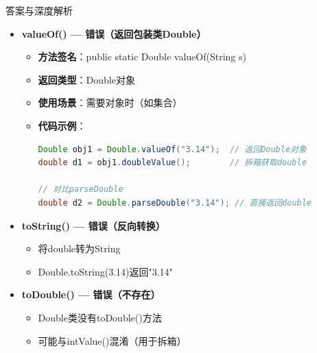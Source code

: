 \documentclass[12pt, a4paper]{ctexart}
\begin{document}
\begin{enumerate}[label=\textbf{\arabic*.}]
\begin{bluebox}{答案与深度解析}
\begin{itemize}[leftmargin=*, nosep, label={}]
\begin{itemize}[label={}, leftmargin=*, nosep]
\begin{lstlisting}[language=Java]
// 异常情况
double d3 = Double.parseDouble("abc");
// NumberFormatException

// 特值解析
double d4 = Double.parseDouble("Infinity");  // 无穷大
double d5 = Double.parseDouble("NaN");       // 非数字
double d6 = Double.parseDouble("-Infinity"); // 负无穷
				            \end{lstlisting}
				            \item \textbf{底层实现}：使用FloatingDecimal.parseDouble()
			            \end{itemize}

			      \item[B] \textbf{valueOf() — 错误（返回包装类Double）}
			            \begin{itemize}[label={}, leftmargin=*, nosep]
				            \item \textbf{方法签名}：public static Double valueOf(String s)
				            \item \textbf{返回类型}：Double对象
				            \item \textbf{使用场景}：需要对象时（如集合）
				            \item \textbf{代码示例}：
				                  \begin{lstlisting}[language=Java]
Double obj1 = Double.valueOf("3.14");  // 返回Double对象
double d1 = obj1.doubleValue();        // 拆箱获取double

// 对比parseDouble
double d2 = Double.parseDouble("3.14"); // 直接返回double
				            \end{lstlisting}
			            \end{itemize}

			      \item[C] \textbf{toString() — 错误（反向转换）}
			            \begin{itemize}[label={}, leftmargin=*, nosep]
				            \item 将double转为String
				            \item Double.toString(3.14)返回"3.14"
			            \end{itemize}

			      \item[D] \textbf{toDouble() — 错误（不存在）}
			            \begin{itemize}[label={}, leftmargin=*, nosep]
				            \item Double类没有toDouble()方法
				            \item 可能与intValue()混淆（用于拆箱）
			            \end{itemize}
		      \end{itemize}


\end{bluebox}
\end{enumerate}
\end{document}
